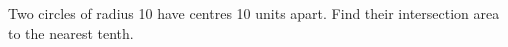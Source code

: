 Two circles of radius 10 have centres 10 units apart. Find their intersection area to the nearest tenth.
